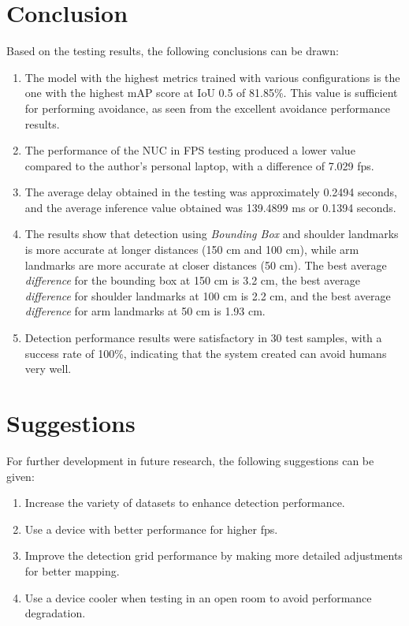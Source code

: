 \section{Conclusion}
\label{sec:conclusion}


Based on the testing results, the following conclusions can be drawn:

\begin{enumerate}
  \item The model with the highest metrics trained with various configurations is the one with the highest mAP score at IoU 0.5 of 81.85\%. This value is sufficient for performing avoidance, as seen from the excellent avoidance performance results.
  \item The performance of the NUC in FPS testing produced a lower value compared to the author's personal laptop, with a difference of 7.029 fps.
  \item The average delay obtained in the testing was approximately 0.2494 seconds, and the average inference value obtained was 139.4899 ms or 0.1394 seconds.
  \item The results show that detection using \emph{Bounding Box} and shoulder landmarks is more accurate at longer distances (150 cm and 100 cm), while arm landmarks are more accurate at closer distances (50 cm). The best average \emph{difference} for the bounding box at 150 cm is 3.2 cm, the best average \emph{difference} for shoulder landmarks at 100 cm is 2.2 cm, and the best average \emph{difference} for arm landmarks at 50 cm is 1.93 cm.
  \item Detection performance results were satisfactory in 30 test samples, with a success rate of 100\%, indicating that the system created can avoid humans very well.

\end{enumerate}

\section{Suggestions}
\label{chap:suggestions}

For further development in future research, the following suggestions can be given:

\begin{enumerate}

  \item Increase the variety of datasets to enhance detection performance.
  \item Use a device with better performance for higher fps.
  \item Improve the detection grid performance by making more detailed adjustments for better mapping.
  \item Use a device cooler when testing in an open room to avoid performance degradation.
\end{enumerate}
